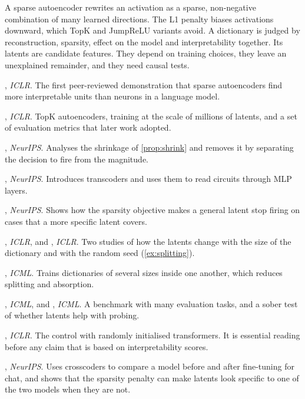 \begin{takeaways}
A sparse autoencoder rewrites an activation as a sparse, non-negative combination of many learned directions.
The L1 penalty biases activations downward, which TopK and JumpReLU variants avoid. A dictionary is judged
by reconstruction, sparsity, effect on the model and interpretability together. Its latents are candidate
features. They depend on training choices, they leave an unexplained remainder, and they need causal tests.
\end{takeaways}

\begin{readinglist}
\item \citet{cunningham2024sparse}, \emph{ICLR}. The first peer-reviewed demonstration that sparse autoencoders
find more interpretable units than neurons in a language model.
\item \citet{gao2025scaling}, \emph{ICLR}. TopK autoencoders, training at the scale of millions of latents, and a
set of evaluation metrics that later work adopted.
\item \citet{rajamanoharan2024improving}, \emph{NeurIPS}. Analyses the shrinkage of \cref{prop:shrink} and removes
it by separating the decision to fire from the magnitude.
\item \citet{dunefsky2024transcoders}, \emph{NeurIPS}. Introduces transcoders and uses them to read circuits
through MLP layers.
\item \citet{chanin2024absorption}, \emph{NeurIPS}. Shows how the sparsity objective makes a general latent stop
firing on cases that a more specific latent covers.
\item \citet{leask2025sparse}, \emph{ICLR}, and \citet{paulo2025sparse}, \emph{ICLR}. Two studies of how the latents
change with the size of the dictionary and with the random seed (\cref{ex:splitting}).
\item \citet{bussmann2025learning}, \emph{ICML}. Trains dictionaries of several sizes inside one another, which
reduces splitting and absorption.
\item \citet{karvonen2025saebench}, \emph{ICML}, and \citet{kantamneni2025sparse}, \emph{ICML}. A benchmark with
many evaluation tasks, and a sober test of whether latents help with probing.
\item \citet{heap2025sparse}, \emph{ICLR}. The control with randomly initialised transformers. It is essential
reading before any claim that is based on interpretability scores.
\item \citet{minder2025overcoming}, \emph{NeurIPS}. Uses crosscoders to compare a model before and after
fine-tuning for chat, and shows that the sparsity penalty can make latents look specific to one of the two models
when they are not.
\end{readinglist}
